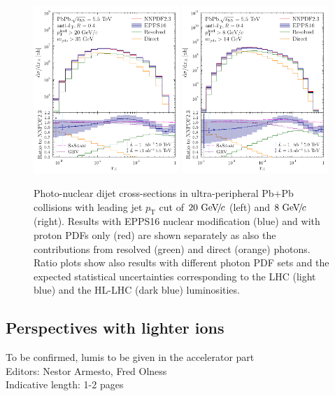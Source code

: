 \documentclass[../report.tex]{subfiles}
\begin{document}
\begin{figure}
\includegraphics[width=0.49\textwidth]{figs/plotxA_ATLAS.pdf}
\includegraphics[width=0.49\textwidth]{figs/plotxA_pTlow.pdf}
\caption{Photo-nuclear dijet cross-sections in ultra-peripheral Pb+Pb collisions with leading jet $p_{\mathrm{T}}$ cut of $20~\text{GeV}\!/\mspace{-2mu}c$ (left) and $8~\text{GeV}\!/\mspace{-2mu}c$ (right). Results with EPPS16 nuclear modification (blue) and with proton PDFs only (red) are shown separately as also the contributions from resolved (green) and direct (orange) photons. Ratio plots show also results with different photon PDF sets and the expected statistical uncertainties corresponding to the LHC (light blue) and the HL-LHC (dark blue) luminosities.}
\label{fig:UPCdijetNPDF}
\end{figure}



\subsection{Perspectives with lighter ions}
To be confirmed, lumis to be given in the accelerator part \\
Editors: Nestor Armesto, Fred Olness \\
Indicative length: 1-2 pages \\
\end{document}
